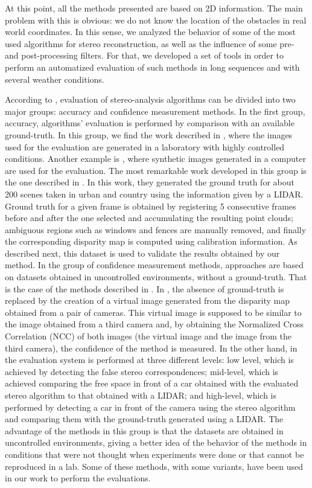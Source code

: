 At this point, all the methods presented are based on 2D information. The main problem with this is obvious: we do not know the location of the obstacles in real world coordinates. In this sense, we analyzed the behavior of some of the most used algorithms for stereo reconstruction, as well as the influence of some pre- and post-processing filters. For that, we developed a set of tools in order to perform an automatized evaluation of such methods in long sequences and with several weather conditions. 

According to \cite{Morales2012}, evaluation of stereo-analysis algorithms can be divided into two major groups: accuracy and confidence measurement methods.
In the first group, accuracy, algorithms' evaluation is performed by comparison with an available ground-truth. In this group, we find the work described in \cite{Steingrube2009}, where the images used for the evaluation are generated in a laboratory with highly controlled conditions. Another example is \cite{Vaudrey2008}, where synthetic images generated in a computer are used for the evaluation. The most remarkable work developed in this group is the one described in \cite{Geiger2012}. In this work, they generated the ground truth for about 200 scenes taken in urban and country using the information given by a \ac{LIDAR}. Ground truth for a given frame is obtained by registering 5 consecutive frames before and after the one selected and accumulating the resulting point clouds; ambiguous regions such as windows and fences are manually removed, and finally the corresponding 
disparity map is computed using calibration information. As described next, this dataset is used to validate the results obtained by our method.
In the group of confidence measurement methods, approaches are based on datasets obtained in uncontrolled environments, without a ground-truth. That is the case of the methods described in \cite{Morales2012, Steingrube2009}. In \cite{Morales2012}, the absence of ground-truth is replaced by the creation of a virtual image generated from the disparity map obtained from a pair of cameras. This virtual image is supposed to be similar to the image obtained from a third camera and, by obtaining the Normalized Cross Correlation (NCC) of both images (the virtual image and the image from the third camera), the confidence of the method is measured. In the other hand, in \cite{Steingrube2009} the evaluation system is performed at three different levels: low level, which is achieved by detecting the false stereo correspondences; mid-level, which is achieved comparing the free space in front of a car obtained with the evaluated stereo algorithm to that obtained with a LIDAR; and high-level, which is performed by 
detecting a car in front of the camera using the stereo algorithm and comparing them with the ground-truth generated using a LIDAR. The advantage of the methods in this group is that the datasets are obtained in uncontrolled environments, giving a better idea of the behavior of the methods in conditions that were not thought when experiments were done or that cannot be reproduced in a lab. Some of these methods, with some variants, have been used in our work to perform the evaluations.

